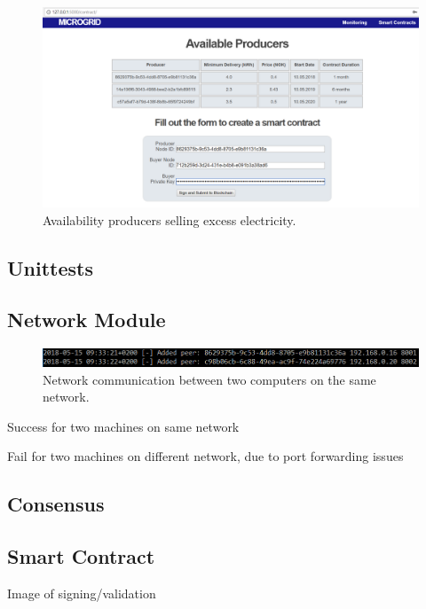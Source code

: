 \begin{figure}[!htb]
\centering
	\includegraphics[width=1\textwidth]{Images/contract}
	\caption{Availability producers selling excess electricity.}
	\label{contract}
\end{figure}


\subsection{Unittests}

\subsection{Network Module}

\begin{figure}[!htb]
\centering
	\includegraphics[width=1\textwidth]{Images/connection}
	\caption{Network communication between two computers on the same network.}
	\label{connection}
\end{figure}

Success for two machines on same network


Fail for two machines on different network, due to port forwarding issues

\subsection{Consensus}

\subsection{Smart Contract}\label{scres}
Image of signing/validation 